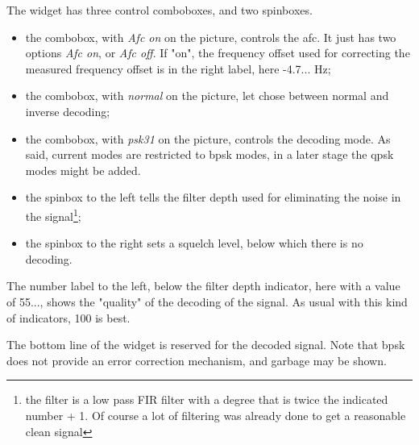 \documentclass[11pt]{article}
\begin{document}
The widget has three control comboboxes, and two spinboxes.

\begin{itemize}
\item the combobox, with {\em Afc on} on the picture, controls the afc. 
It just has two options {\em Afc on}, or {\em Afc off}. If "on", the
frequency offset used for correcting the measured frequency offset is
in the right label, here -4.7... Hz;
\item the combobox, with {\em normal} on the picture, let chose between
normal and inverse decoding;
\item the combobox, with {\em psk31} on the picture, controls the decoding mode.
As said, current modes are restricted to bpsk modes, in a later stage
the qpsk modes might be added.
\item the spinbox to the left tells the filter depth used for eliminating
the noise in the signal\footnote{the filter is a low pass FIR filter with
a degree that is twice the indicated number + 1. Of course a lot of filtering
was already done to get a reasonable clean signal};
\item the spinbox to the right sets a squelch level, below which there
is no decoding.
\end{itemize}

The number label to the left, below the filter depth indicator,
here with a value of 55...,
shows the "quality" of the decoding of the signal. As usual
with this kind of indicators, 100 is best.

The bottom line of the widget is reserved for the decoded signal. Note that
bpsk does not provide an error correction mechanism, and garbage may be shown.
\end{document}
